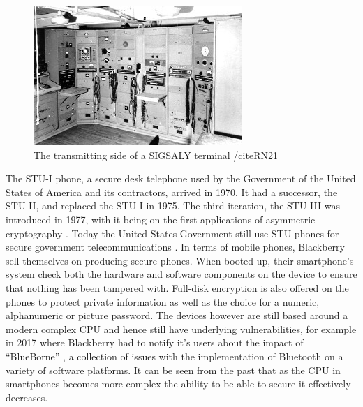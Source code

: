 \begin{figure}
	\includegraphics[width=\linewidth]{terminal.jpg}
	\caption{The transmitting side of a SIGSALY terminal /cite{RN21}}
	\label{fig:SIGSALY}
\end{figure}

	The STU-I phone, a secure desk telephone used by the Government of the United States of America and its contractors, arrived in 1970. It had a successor, the STU-II, and replaced the STU-I in 1975. The third iteration, the STU-III was introduced in 1977, with it being on the first applications of asymmetric cryptography \cite{RN30}. Today the United States Government still use STU phones for secure government telecommunications \cite{RN30}.
	In terms of mobile phones, Blackberry sell themselves on producing secure phones. When booted up, their smartphone’s system check both the hardware and software components on the device to ensure that nothing has been tampered with. Full-disk encryption is also offered on the phones to protect private information as well as the choice for a numeric, alphanumeric or picture password. The devices however are still based around a modern complex CPU and hence still have underlying vulnerabilities, for example in 2017 where Blackberry had to notify it’s users about the impact of “BlueBorne” \cite{RN20}, a collection of issues with the implementation of Bluetooth on a variety of software platforms. 
	It can be seen from the past that as the CPU in smartphones becomes more complex the ability to be able to secure it effectively decreases. 



